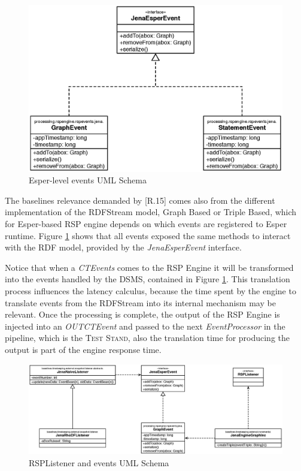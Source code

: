 \begin{figure}[tbh]
  \centering
	\includegraphics[width=0.8\linewidth]{images/uml_baselines_events}
	\caption{Esper-level events UML Schema} 
  	\label{fig:uml_baselines_events}
\end{figure}

The baselines relevance demanded by [R.15] comes also from the different implementation of the RDFStream model, Graph Based or Triple Based, which for Esper-based RSP engine depends on which events are registered to Esper runtime. Figure \ref{fig:uml_baselines_events} shows that all events exposed the same methods to interact with the RDF model, provided by the \textit{JenaEsperEvent} interface. 

Notice that when a \textit{CTEvents} comes to the RSP Engine it will be transformed into the events handled by the DSMS, contained in Figure \ref{fig:uml_baselines_events}. This translation process influences the latency calculus, because the time spent by the engine to translate events from the RDFStream into its internal mechanism may be relevant. Once the processing is complete, the output of the RSP Engine is injected into an \textit{OUTCTEvent} and passed to the next \textit{EventProcessor} in the pipeline, which is the \textsc{Test Stand}, also the translation time for producing the output is part of the engine response time.


\begin{figure}[tbh]
  \centering
	\includegraphics[width=\linewidth]{images/uml_baselines_rel_listener_event}
	\caption{RSPListener and events UML Schema} 
  	\label{fig:uml_baselines_rel_listener_event}
\end{figure}


